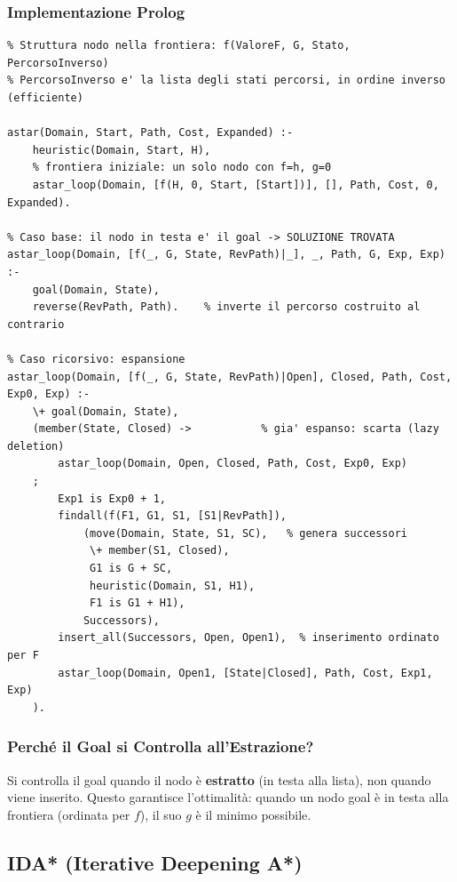 \documentclass[12pt,a4paper]{article}
\begin{document}
\subsubsection{Implementazione Prolog}

\begin{lstlisting}
% Struttura nodo nella frontiera: f(ValoreF, G, Stato, PercorsoInverso)
% PercorsoInverso e' la lista degli stati percorsi, in ordine inverso (efficiente)

astar(Domain, Start, Path, Cost, Expanded) :-
    heuristic(Domain, Start, H),
    % frontiera iniziale: un solo nodo con f=h, g=0
    astar_loop(Domain, [f(H, 0, Start, [Start])], [], Path, Cost, 0, Expanded).

% Caso base: il nodo in testa e' il goal -> SOLUZIONE TROVATA
astar_loop(Domain, [f(_, G, State, RevPath)|_], _, Path, G, Exp, Exp) :-
    goal(Domain, State),
    reverse(RevPath, Path).    % inverte il percorso costruito al contrario

% Caso ricorsivo: espansione
astar_loop(Domain, [f(_, G, State, RevPath)|Open], Closed, Path, Cost, Exp0, Exp) :-
    \+ goal(Domain, State),
    (member(State, Closed) ->           % gia' espanso: scarta (lazy deletion)
        astar_loop(Domain, Open, Closed, Path, Cost, Exp0, Exp)
    ;
        Exp1 is Exp0 + 1,
        findall(f(F1, G1, S1, [S1|RevPath]),
            (move(Domain, State, S1, SC),   % genera successori
             \+ member(S1, Closed),
             G1 is G + SC,
             heuristic(Domain, S1, H1),
             F1 is G1 + H1),
            Successors),
        insert_all(Successors, Open, Open1),  % inserimento ordinato per F
        astar_loop(Domain, Open1, [State|Closed], Path, Cost, Exp1, Exp)
    ).
\end{lstlisting}

\subsubsection{Perché il Goal si Controlla all'Estrazione?}

Si controlla il goal quando il nodo è \textbf{estratto} (in testa alla lista), non
quando viene inserito. Questo garantisce l'ottimalità: quando un nodo goal è in testa
alla frontiera (ordinata per $f$), il suo $g$ è il minimo possibile.

\subsection{IDA* (Iterative Deepening A*)}
\end{document}
